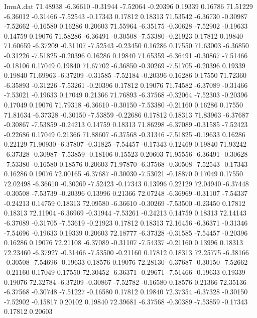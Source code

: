\begin{filecontents}{ImuA.dat}
  71.48938   -6.36610   -0.31944   -7.52064   -0.20396    0.19339    0.16786
  71.51229   -6.36012   -0.31466   -7.52543   -0.17343    0.17812    0.18313
  71.53542   -6.36730   -0.30987   -7.52662   -0.16580    0.16286    0.20603
  71.55964   -6.35175   -0.30628   -7.52902   -0.19633    0.14759    0.19076
  71.58286   -6.36491   -0.30508   -7.53380   -0.21923    0.17812    0.19840
  71.60659   -6.37209   -0.31107   -7.52543   -0.23450    0.16286    0.17550
  71.63003   -6.36850   -0.31226   -7.51825   -0.20396    0.16286    0.19840
  71.65359   -6.36491   -0.30867   -7.51466   -0.18106    0.17049    0.19840
  71.67702   -6.36850   -0.30269   -7.51705   -0.20396    0.19339    0.19840
  71.69963   -6.37209   -0.31585   -7.52184   -0.20396    0.16286    0.17550
  71.72360   -6.35893   -0.31226   -7.53261   -0.20396    0.17812    0.19076
  71.74582   -6.37089   -0.31466   -7.53021   -0.19633    0.17049    0.21366
  71.76893   -6.37568   -0.32064   -7.52303   -0.20396    0.17049    0.19076
  71.79318   -6.36610   -0.30150   -7.53380   -0.21160    0.16286    0.17550
  71.81634   -6.37328   -0.30150   -7.53859   -0.22686    0.17812    0.18313
  71.83963   -6.37687   -0.30867   -7.53859   -0.24213    0.14759    0.18313
  71.86298   -6.37089   -0.31585   -7.52423   -0.22686    0.17049    0.21366
  71.88607   -6.37568   -0.31346   -7.51825   -0.19633    0.16286    0.22129
  71.90930   -6.37807   -0.31825   -7.54457   -0.17343    0.12469    0.19840
  71.93242   -6.37328   -0.30987   -7.53859   -0.18106    0.15523    0.20603
  71.95556   -6.36491   -0.30628   -7.53380   -0.16580    0.18576    0.20603
  71.97870   -6.37568   -0.30508   -7.52543   -0.17343    0.16286    0.19076
  72.00165   -6.37687   -0.30030   -7.53021   -0.18870    0.17049    0.17550
  72.02498   -6.36610   -0.30269   -7.52423   -0.17343    0.13996    0.22129
  72.04940   -6.37448   -0.30508   -7.53739   -0.20396    0.13996    0.21366
  72.07248   -6.36969   -0.31107   -7.54337   -0.24213    0.14759    0.18313
  72.09580   -6.36610   -0.30269   -7.53500   -0.23450    0.17812    0.18313
  72.11904   -6.36969   -0.31944   -7.53261   -0.24213    0.14759    0.18313
  72.14143   -6.37089   -0.31705   -7.53619   -0.21923    0.17812    0.18313
  72.16456   -6.36371   -0.31346   -7.54696   -0.19633    0.19339    0.20603
  72.18777   -6.37328   -0.31585   -7.54457   -0.20396    0.16286    0.19076
  72.21108   -6.37089   -0.31107   -7.54337   -0.21160    0.13996    0.18313
  72.23460   -6.37927   -0.31466   -7.53500   -0.21160    0.17812    0.18313
  72.25775   -6.38166   -0.30508   -7.54696   -0.19633    0.18576    0.19076
  72.28130   -6.37687   -0.30150   -7.52662   -0.21160    0.17049    0.17550
  72.30452   -6.36371   -0.29671   -7.51466   -0.19633    0.19339    0.19076
  72.32784   -6.37209   -0.30867   -7.52782   -0.16580    0.18576    0.21366
  72.35136   -6.37568   -0.30748   -7.51227   -0.16580    0.17812    0.19840
  72.37354   -6.37328   -0.30150   -7.52902   -0.15817    0.20102    0.19840
  72.39681   -6.37568   -0.30389   -7.53859   -0.17343    0.17812    0.20603
\end{filecontents}
